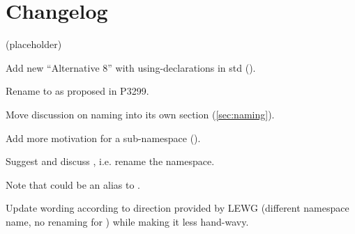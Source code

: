 \section{Changelog}
(placeholder)
\begin{revision}
\item Add new “Alternative 8” with using-declarations in std ().
\item Rename  to  as proposed in P3299.
\item Move discussion on naming into its own section (\ref{sec:naming}).
\item Add more motivation for a sub-namespace ().
\end{revision}

\begin{revision}
\item Suggest and discuss , i.e. rename the namespace.
\item Note that  could be an alias to .
\end{revision}

\begin{revision}
\item Update wording according to direction provided by LEWG (different
  namespace name, no renaming for ) while making it less
  hand-wavy.
\end{revision}
